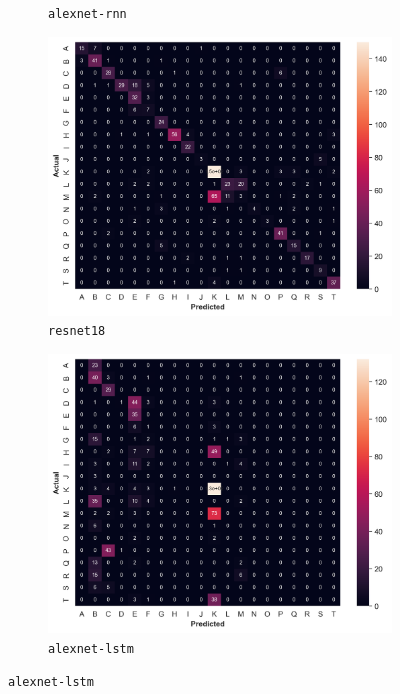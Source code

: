 \documentclass[a4paper]{article}
\begin{document}
\begin{figure}[b]
\begin{subfigure}{.33\textwidth}
        \caption{\texttt{alexnet-rnn}}
    \end{subfigure}
    \begin{subfigure}{.33\textwidth}
        \centering
        \includegraphics[width=\textwidth]
        {figures/experiment1-conf-matrix-resnet18.png}
        \caption{\texttt{resnet18}}
    \end{subfigure}
    \begin{subfigure}{.33\textwidth}
        \centering
        \includegraphics[width=\textwidth]
        {figures/experiment1-conf-matrix-alexnet-lstm.png}
        \caption{\texttt{alexnet-lstm}}

\end{subfigure}
\end{figure}
\end{document}
